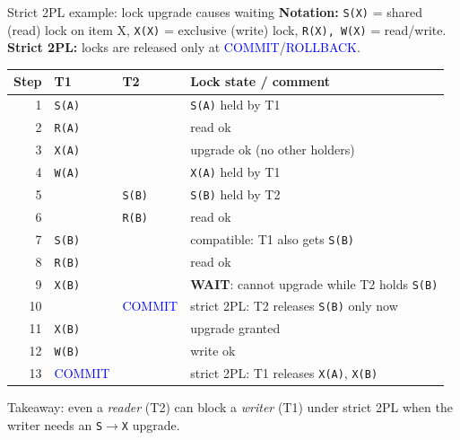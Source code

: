\documentclass[10pt,aspectratio=169]{beamer}
\newcommand{\sqlk}[1]{\textcolor{blue}{#1}}
\begin{document}
\begin{frame}{Strict 2PL example: lock upgrade causes waiting}
\small
\textbf{Notation:} \texttt{S(X)} = shared (read) lock on item X,\;
\texttt{X(X)} = exclusive (write) lock,\;
\texttt{R(X), W(X)} = read/write.\;
\textbf{Strict 2PL:} locks are released only at \sqlk{COMMIT}/\sqlk{ROLLBACK}.

\vspace{1mm}
\begin{center}
\scriptsize
\begin{tabular}{@{}r l l p{}@{}}
\toprule
\textbf{Step} & \textbf{T1} & \textbf{T2} & \textbf{Lock state / comment}\\
\midrule
1  & \texttt{S(A)} &  & \texttt{S(A)} held by T1\\
2  & \texttt{R(A)} &  & read ok\\
3  & \texttt{X(A)} &  & upgrade ok (no other holders)\\
4  & \texttt{W(A)} &  & \texttt{X(A)} held by T1\\
5  &  & \texttt{S(B)} & \texttt{S(B)} held by T2\\
6  &  & \texttt{R(B)} & read ok\\
7  & \texttt{S(B)} &  & compatible: T1 also gets \texttt{S(B)}\\
8  & \texttt{R(B)} &  & read ok\\
9  & \texttt{X(B)} &  & \textbf{WAIT}: cannot upgrade while T2 holds \texttt{S(B)}\\
10 &  & \sqlk{COMMIT} & strict 2PL: T2 releases \texttt{S(B)} only now\\
11 & \texttt{X(B)} &  & upgrade granted\\
12 & \texttt{W(B)} &  & write ok\\
13 & \sqlk{COMMIT} &  & strict 2PL: T1 releases \texttt{X(A)}, \texttt{X(B)}\\
\bottomrule
\end{tabular}
\end{center}

\footnotesize
Takeaway: even a \emph{reader} (T2) can block a \emph{writer} (T1) under strict 2PL when the writer needs an \texttt{S$\rightarrow$X} upgrade.
\end{frame}
\end{document}
